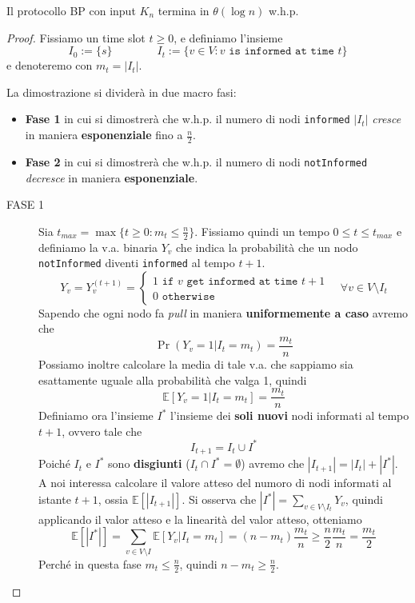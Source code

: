 \begin{teorema}
    Il protocollo BP con input $K_n$ termina in $\theta(\log n)$ w.h.p.
    \begin{proof}
        Fissiamo un time slot $t \geq 0$, e definiamo l'insieme
        \[
            I_0 := \{s\} \qquad \qquad
            I_t := \{v \in V: v \texttt{ is informed at time } t\}
        \]
        e denoteremo con $m_t = |I_t|$.

        La dimostrazione si dividerà in due macro fasi:
        \begin{itemize}
            \item \textbf{Fase 1} in cui si dimostrerà che w.h.p. il numero di nodi \texttt{informed} $|I_t|$ \textit{cresce} in maniera \textbf{esponenziale} fino a $\frac{n}{2}$.
            \item \textbf{Fase 2} in cui si dimostrerà che w.h.p. il numero di nodi \texttt{notInformed} \textit{decresce} in maniera \textbf{esponenziale}.
        \end{itemize}
        
        \begin{description}
            \item[FASE 1] Sia $t_{max} = \max\{t \geq 0: m_t \leq \frac{n}{2}\}$. Fissiamo quindi un tempo $0 \leq t \leq t_{max}$ e definiamo la v.a. binaria $Y_v$ che indica la probabilità che un nodo \texttt{notInformed} diventi \texttt{informed} al tempo $t + 1$.
            \[
                Y_v = Y^{(t+1)}_v = 
                \begin{cases*}
                    1 \texttt{ if } v \texttt{ get informed at time } t + 1 \\
                    0 \texttt{ otherwise}
                \end{cases*}
                \quad \forall v \in V \setminus I_t
            \]
            Sapendo che ogni nodo fa \textit{pull} in maniera \textbf{uniformemente a caso} avremo che
            \[
                \Pr\left( Y_v = 1 | I_t = m_t\right) = \frac{m_t}{n}
            \]
            Possiamo inoltre calcolare la media di tale v.a. che sappiamo sia esattamente uguale alla probabilità che valga 1, quindi
            \[
                \mathbb{E}\left[ Y_v = 1 | I_t = m_t \right] = \frac{m_t}{n}
            \]
            Definiamo ora l'insieme $I^*$ l'insieme dei \textbf{soli nuovi} nodi informati al tempo $t + 1$, ovvero tale che
            \[
                I_{t + 1} = I_t \cup I^*
            \]
            Poiché $I_t$ e $I^*$ sono \textbf{disgiunti} ($I_t \cap I^* = \emptyset$) avremo che $|I_{t+1}| = |I_t| + |I^*|$.
            A noi interessa calcolare il valore atteso del numoro di nodi informati al istante $t+1$, ossia $\mathbb{E}[|I_{t+1}|]$. Si osserva che $|I^*| = \sum_{v \in V \setminus I_t}Y_v$, quindi applicando il valor atteso e la linearità del valor atteso, otteniamo
            \[
                \mathbb{E}\left[ |I^*| \right] = \sum_{v \in V \setminus I} \mathbb{E}[Y_v | I_t = m_t] = (n-m_t)\frac{m_t}{n} \geq \frac{n}{2}\frac{m_t}{n} = \frac{m_t}{2}
            \]
            Perché in questa fase $m_t \leq \frac{n}{2}$, quindi $n - m_t \geq \frac{n}{2}$.
            

\end{description}
\end{proof}
\end{teorema}
